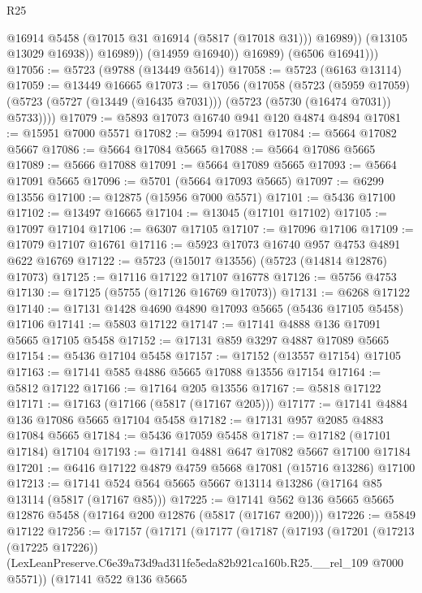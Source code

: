 \begin{lexlean}{R25}
\begin{coremodule}
                      @16914
                      @5458
                      (@17015 @31 @16914 (@5817 (@17018 @31)))
                      @16989))
                  (@13105 @13029 @16938))
                @16989))
            (@14959 @16940))
          @16989)
        (@6506 @16941)))
@17056 := @5723 (@9788 (@13449 @5614))
@17058 := @5723 (@6163 @13114)
@17059 := @13449 @16665
@17073 := @17056
    (@17058
      (@5723
        (@5959 @17059)
        (@5723 (@5727 (@13449 (@16435 @7031))) (@5723 (@5730 (@16474 @7031)) @5733))))
@17079 := @5893 @17073 @16740 @941 @120 @4874 @4894
@17081 := @15951 @7000 @5571
@17082 := @5994 @17081
@17084 := @5664 @17082 @5667
@17086 := @5664 @17084 @5665
@17088 := @5664 @17086 @5665
@17089 := @5666 @17088
@17091 := @5664 @17089 @5665
@17093 := @5664 @17091 @5665
@17096 := @5701 (@5664 @17093 @5665)
@17097 := @6299 @13556
@17100 := @12875 (@15956 @7000 @5571)
@17101 := @5436 @17100
@17102 := @13497 @16665
@17104 := @13045 (@17101 @17102)
@17105 := @17097 @17104
@17106 := @6307 @17105
@17107 := @17096 @17106
@17109 := @17079 @17107 @16761
@17116 := @5923 @17073 @16740 @957 @4753 @4891 @622 @16769
@17122 := @5723 (@15017 @13556) (@5723 (@14814 @12876) @17073)
@17125 := @17116 @17122 @17107 @16778
@17126 := @5756 @4753
@17130 := @17125 (@5755 (@17126 @16769 @17073))
@17131 := @6268 @17122
@17140 := @17131 @1428 @4690 @4890 @17093 @5665 (@5436 @17105 @5458) @17106
@17141 := @5803 @17122
@17147 := @17141 @4888 @136 @17091 @5665 @17105 @5458
@17152 := @17131 @859 @3297 @4887 @17089 @5665
@17154 := @5436 @17104 @5458
@17157 := @17152 (@13557 @17154) @17105
@17163 := @17141 @585 @4886 @5665 @17088 @13556 @17154
@17164 := @5812 @17122
@17166 := @17164 @205 @13556
@17167 := @5818 @17122
@17171 := @17163 (@17166 (@5817 (@17167 @205)))
@17177 := @17141 @4884 @136 @17086 @5665 @17104 @5458
@17182 := @17131 @957 @2085 @4883 @17084 @5665
@17184 := @5436 @17059 @5458
@17187 := @17182 (@17101 @17184) @17104
@17193 := @17141 @4881 @647 @17082 @5667 @17100 @17184
@17201 := @6416 @17122 @4879 @4759 @5668 @17081 (@15716 @13286) @17100
@17213 := @17141 @524 @564 @5665 @5667 @13114 @13286 (@17164 @85 @13114 (@5817 (@17167 @85)))
@17225 := @17141 @562 @136 @5665 @5665 @12876 @5458 (@17164 @200 @12876 (@5817 (@17167 @200)))
@17226 := @5849 @17122
@17256 := @17157
    (@17171
      (@17177
        (@17187
          (@17193
            (@17201
              (@17213 (@17225 @17226))
              (LexLeanPreserve.C6e39a73d9ad311fe5eda82b921ca160b.R25.__rel_109 @7000 @5571))
            (@17141
              @522
              @136
              @5665

\end{coremodule}
\end{lexlean}
